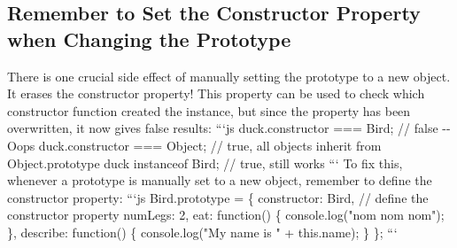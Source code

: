 \documentclass{article}%
\begin{document}
\subsection{Remember to Set the Constructor Property when Changing the Prototype}%
\label{subsec:RemembertoSettheConstructorPropertywhenChangingthePrototype}%
There is one crucial side effect of manually setting the prototype to a new object. It erases the constructor property! This property can be used to check which constructor function created the instance, but since the property has been overwritten, it now gives false results:\newline%
```js\newline%
duck.constructor === Bird; // false {-}{-} Oops\newline%
duck.constructor === Object; // true, all objects inherit from Object.prototype\newline%
duck instanceof Bird; // true, still works\newline%
```\newline%
To fix this, whenever a prototype is manually set to a new object, remember to define the constructor property:\newline%
```js\newline%
Bird.prototype = \{\newline%
  constructor: Bird, // define the constructor property\newline%
  numLegs: 2,\newline%
  eat: function() \{\newline%
    console.log("nom nom nom");\newline%
  \},\newline%
  describe: function() \{\newline%
    console.log("My name is " + this.name); \newline%
  \}\newline%
\};\newline%
```\newline%

%
\end{document}
